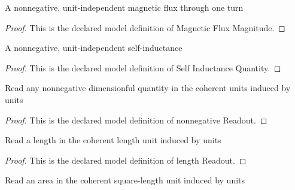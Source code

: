 \begin{definition}
  \label{def:physics:phyx-mini-0940:phyxminiproblems-problemphyxmini0940-magneticfluxmagnitude}
  A nonnegative, unit-independent magnetic flux through one turn
\end{definition}
\begin{proof}
  This is the declared model definition of Magnetic Flux Magnitude.
\end{proof}
\begin{definition}
  \label{def:physics:phyx-mini-0940:phyxminiproblems-problemphyxmini0940-selfinductancequantity}
  A nonnegative, unit-independent self-inductance
\end{definition}
\begin{proof}
  This is the declared model definition of Self Inductance Quantity.
\end{proof}
\begin{definition}
  \label{def:physics:phyx-mini-0940:phyxminiproblems-problemphyxmini0940-nonnegativereadout}
  Read any nonnegative dimensionful quantity in the coherent units induced by units
\end{definition}
\begin{proof}
  This is the declared model definition of nonnegative Readout.
\end{proof}
\begin{definition}
  \label{def:physics:phyx-mini-0940:phyxminiproblems-problemphyxmini0940-lengthreadout}
  Read a length in the coherent length unit induced by units
\end{definition}
\begin{proof}
  This is the declared model definition of length Readout.
\end{proof}
\begin{definition}
  \label{def:physics:phyx-mini-0940:phyxminiproblems-problemphyxmini0940-areareadout}
  Read an area in the coherent square-length unit induced by units
\end{definition}
